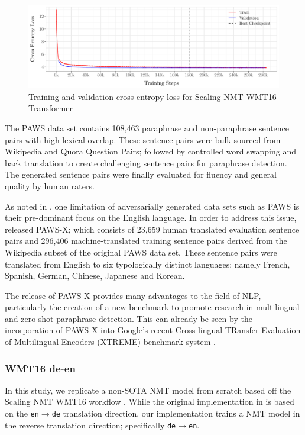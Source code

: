 \documentclass[11pt,a4paper]{article}
\begin{document}
\begin{figure}
  \centering 
  \includegraphics[trim={0cm 0cm 0cm 0cm},clip,width=\textwidth]{transformer_nmt_evolution.pdf}
  \caption{Training and validation cross entropy loss for Scaling NMT WMT16 Transformer}
  \label{transformer_nmt_evolution}
\end{figure}

The PAWS data set contains 108,463 paraphrase and non-paraphrase sentence pairs with high lexical overlap. These sentence pairs were bulk sourced from Wikipedia and Quora Question Pairs; followed by controlled word swapping and back translation to create challenging sentence pairs for paraphrase detection. The generated sentence pairs were finally evaluated for fluency and general quality by human raters.

As noted in \citet{pawsx2019emnlp}, one limitation of adversarially generated data sets such as PAWS is their pre-dominant focus on the English language. In order to address this issue, \citet{pawsx2019emnlp} released PAWS-X; which consists of 23,659 human translated evaluation sentence pairs and 296,406 machine-translated training sentence pairs derived from the Wikipedia subset of the original PAWS data set. These sentence pairs were translated from English to six typologically distinct languages; namely French, Spanish, German, Chinese, Japanese and Korean.

The release of PAWS-X provides many advantages to the field of NLP, particularly the creation of a new benchmark to promote research in multilingual and zero-shot paraphrase detection. This can already be seen by the incorporation of PAWS-X into Google's recent Cross-lingual TRansfer Evaluation of Multilingual Encoders (XTREME) benchmark system \cite{hu2020xtreme}.

\subsubsection{WMT16 de-en}

In this study, we replicate a non-SOTA NMT model from scratch based off the Scaling NMT WMT16 workflow \cite{ott2018scaling}. While the original implementation in \citet{ott2018scaling} is based on the \texttt{en$\rightarrow$de} translation direction, our implementation trains a NMT model in the reverse translation direction; specifically \texttt{de$\rightarrow$en}.
\end{document}
